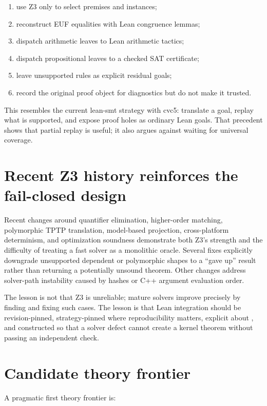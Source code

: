 \documentclass[11pt,letterpaper,openany]{report}
\newcommand{\code}[1]{\texttt{\detokenize{#1}}}
\newcommand{\repo}[1]{\textsf{#1}}
\begin{document}
\begin{enumerate}
  \item use Z3 only to select premises and instances;
  \item reconstruct EUF equalities with Lean congruence lemmas;
  \item dispatch arithmetic leaves to Lean arithmetic tactics;
  \item dispatch propositional leaves to a checked SAT certificate;
  \item leave unsupported rules as explicit residual goals;
  \item record the original proof object for diagnostics but do not make it trusted.
\end{enumerate}

This resembles the current \repo{lean-smt} strategy with cvc5: translate a goal, replay
what is supported, and expose proof holes as ordinary Lean goals. That precedent shows
that partial replay is useful; it also argues against waiting for universal coverage.

\section{Recent Z3 history reinforces the fail-closed design}

Recent changes around quantifier elimination, higher-order matching, polymorphic TPTP
translation, model-based projection, cross-platform determinism, and optimization
soundness demonstrate both Z3's strength and the difficulty of treating a fast solver
as a monolithic oracle. Several fixes explicitly downgrade unsupported dependent or
polymorphic shapes to a ``gave up'' result rather than returning a potentially
unsound theorem. Other changes address solver-path instability caused by hashes or C++
argument evaluation order.

The lesson is not that Z3 is unreliable; mature solvers improve precisely by finding
and fixing such cases. The lesson is that Lean integration should be revision-pinned,
strategy-pinned where reproducibility matters, explicit about \code{unknown}, and
constructed so that a solver defect cannot create a kernel theorem without passing an
independent check.

\section{Candidate theory frontier}

A pragmatic first theory frontier is:
\end{document}
